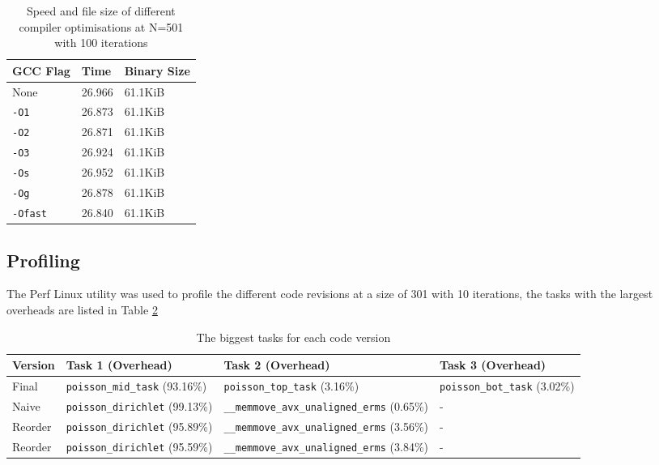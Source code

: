 \documentclass[12pt]{article}
\begin{document}
\begin{table}[H]
    \centering
    \caption{Speed and file size of different compiler optimisations at N=501 with 100 iterations}
    \label{table:opt}
    \begin{tabular}{ | m{4cm} | m{3cm} | m{3cm} | }
        \hline
        \textbf{GCC Flag} & \textbf{Time} & \textbf{Binary Size}\\
        \hline
        None & 26.966 & 61.1KiB\\
        \hline
        \texttt{-O1} & 26.873 & 61.1KiB\\
        \hline
        \texttt{-O2} & 26.871 & 61.1KiB\\
        \hline
        \texttt{-O3} & 26.924 & 61.1KiB\\
        \hline
        \texttt{-Os} & 26.952 & 61.1KiB\\
        \hline
        \texttt{-Og} & 26.878 & 61.1KiB\\
        \hline
        \texttt{-Ofast} & 26.840 & 61.1KiB\\
        \hline
    \end{tabular}
\end{table}

\subsection{Profiling}
The Perf Linux utility was used to profile the different code revisions at a size of 301 with 10 iterations, the tasks with the largest overheads are
listed in Table \ref{table:perf}

\begin{table}[H]
    \centering
    \caption{The biggest tasks for each code version}
    \label{table:perf}
    \begin{tabular}{ | m{1.5cm} | m{4cm} | m{6cm} | m{3.5cm} | }
        \hline
        Version & Task 1 (Overhead) & Task 2 (Overhead) & Task 3 (Overhead)\\
        \hline
        Final & \texttt{poisson\_mid\_task} (93.16\%) & \texttt{poisson\_top\_task} (3.16\%) & \texttt{poisson\_bot\_task} (3.02\%)\\
        \hline
        Naive & \texttt{poisson\_dirichlet} (99.13\%) & \texttt{\_\_memmove\_avx\_unaligned\_erms} (0.65\%) & -\\
        \hline
        Reorder & \texttt{poisson\_dirichlet} (95.89\%) & \texttt{\_\_memmove\_avx\_unaligned\_erms} (3.56\%) & -\\
        \hline
        Reorder & \texttt{poisson\_dirichlet} (95.59\%) & \texttt{\_\_memmove\_avx\_unaligned\_erms} (3.84\%) & -\\
        \hline
    \end{tabular}
\end{table}
\end{document}
